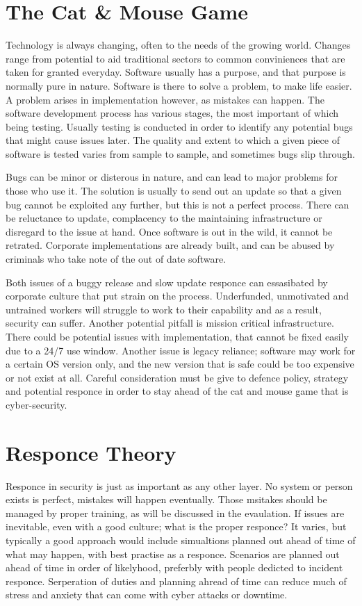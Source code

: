 \section{The Cat \& Mouse Game}
Technology is always changing, often to the needs of the growing world. Changes range from potential to aid traditional sectors to common conviniences that are taken for granted everyday.
Software usually has a purpose, and that purpose is normally pure in nature. Software is there to solve a problem, to make life easier. A problem arises in implementation however, as mistakes can happen.
The software development process has various stages, the most important of which being testing. Usually testing is conducted in order to identify any potential bugs that might cause issues later.
The quality and extent to which a given piece of software is tested varies from sample to sample, and sometimes bugs slip through.

Bugs can be minor or disterous in nature, and can lead to major problems for those who use it.
The solution is usually to send out an update so that a given bug cannot be exploited any further, but this is not a perfect process. There can be reluctance to update, complacency to the maintaining infrastructure or disregard to the issue at hand.
Once software is out in the wild, it cannot be retrated. Corporate implementations are already built, and can be abused by criminals who take note of the out of date software.

Both issues of a buggy release and slow update responce can essasibated by corporate culture that put strain on the process. Underfunded, unmotivated and untrained workers will struggle to work to their capability and as a result, security can suffer. 
Another potential pitfall is mission critical infrastructure. There could be potential issues with implementation, that cannot be fixed easily due to a 24/7 use window. Another issue is legacy reliance; software may work for a certain OS version only, 
and the new version that is safe could be too expensive or not exist at all. Careful consideration must be give to defence policy, strategy and potential responce in order to stay ahead of the cat and mouse game that is cyber-security.



\section{Responce Theory}
Responce in security is just as important as any other layer. No system or person exists is perfect, mistakes will happen eventually. Those msitakes should be managed by proper training, as will be discussed in the evaulation.
If issues are inevitable, even with a good culture; what is the proper responce? It varies, but typically a good approach would include simualtions planned out ahead of time of what may happen, with best practise as a responce.
Scenarios are planned out ahead of time in order of likelyhood, preferbly with people dedicted to incident responce. Serperation of duties and planning ahread of time can reduce much of stress and anxiety that can come with cyber attacks or downtime.


